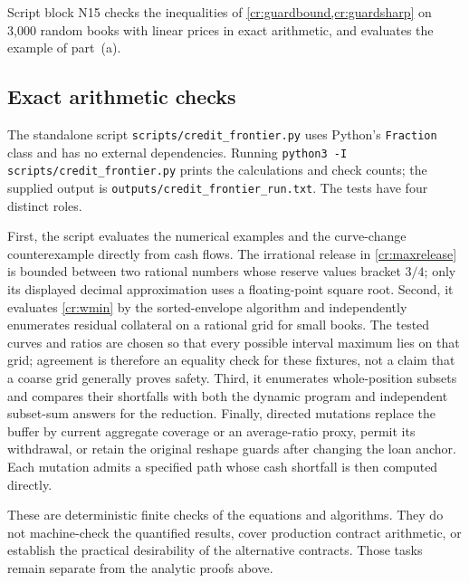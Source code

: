 Script block N15 checks the inequalities of \cref{cr:guardbound,cr:guardsharp} on 3{,}000 random books with linear prices in exact arithmetic, and evaluates the example of part~(a).

\subsection{Exact arithmetic checks}\label{cr:checks}

The standalone script \texttt{scripts/credit\_frontier.py} uses Python's \texttt{Fraction} class and has no external dependencies. Running \texttt{python3 -I scripts/credit\_frontier.py} prints the calculations and check counts; the supplied output is \texttt{outputs/credit\_frontier\_run.txt}. The tests have four distinct roles.

First, the script evaluates the numerical examples and the curve-change counterexample directly from cash flows. The irrational release in \eqref{cr:maxrelease} is bounded between two rational numbers whose reserve values bracket $3/4$; only its displayed decimal approximation uses a floating-point square root. Second, it evaluates \eqref{cr:wmin} by the sorted-envelope algorithm and independently enumerates residual collateral on a rational grid for small books. The tested curves and ratios are chosen so that every possible interval maximum lies on that grid; agreement is therefore an equality check for these fixtures, not a claim that a coarse grid generally proves safety. Third, it enumerates whole-position subsets and compares their shortfalls with both the dynamic program and independent subset-sum answers for the reduction. Finally, directed mutations replace the buffer by current aggregate coverage or an average-ratio proxy, permit its withdrawal, or retain the original reshape guards after changing the loan anchor. Each mutation admits a specified path whose cash shortfall is then computed directly.

These are deterministic finite checks of the equations and algorithms. They do not machine-check the quantified results, cover production contract arithmetic, or establish the practical desirability of the alternative contracts. Those tasks remain separate from the analytic proofs above.
